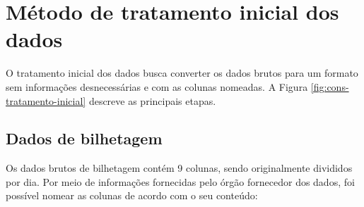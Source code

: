 \documentclass[        
    a4paper,          %
    12pt,             %
    chapter=TITLE,    %
    section=Title,    %
    subsection=Title, %
    oneside,          %
    english,          %
    spanish,          %
    brazil,           %
    fleqn             %
]{abntex2}
\begin{document}
  \hypertarget{metodo-de-tratamento-inicial-dos-dados}{%
  \section{Método de tratamento inicial dos dados}\label{metodo-de-tratamento-inicial-dos-dados}}
  
  O tratamento inicial dos dados busca converter os dados brutos para um formato sem informações desnecessárias e com as colunas nomeadas. A Figura \ref{fig:cons-tratamento-inicial} descreve as principais etapas.
  
  \begin{figure}[!h]
  \captionsetup{width=16cm}
  \centering
  \end{figure}
  
  \hypertarget{dados-de-bilhetagem}{%
  \subsection{Dados de bilhetagem}\label{dados-de-bilhetagem}}
  
  Os dados brutos de bilhetagem contém 9 colunas, sendo originalmente divididos por dia. Por meio de informações fornecidas pelo órgão fornecedor dos dados, foi possível nomear as colunas de acordo com o seu conteúdo:
  
\end{document}
